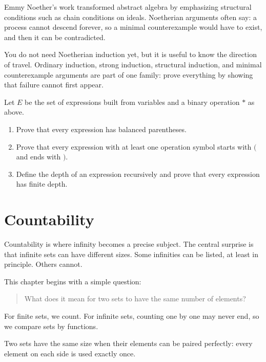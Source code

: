 \begin{historybox}
Emmy Noether's work transformed abstract algebra by emphasizing structural conditions such as chain conditions on ideals. Noetherian arguments often say: a process cannot descend forever, so a minimal counterexample would have to exist, and then it can be contradicted.
\end{historybox}

You do not need Noetherian induction yet, but it is useful to know the direction of travel. Ordinary induction, strong induction, structural induction, and minimal counterexample arguments are part of one family: prove everything by showing that failure cannot first appear.

\begin{labbox}
Let $E$ be the set of expressions built from variables and a binary operation $*$ as above.
\begin{enumerate}
\item Prove that every expression has balanced parentheses.
\item Prove that every expression with at least one operation symbol starts with $($ and ends with $)$.
\item Define the depth of an expression recursively and prove that every expression has finite depth.
\end{enumerate}
\end{labbox}

\newpage
\section{Countability}

Countability is where infinity becomes a precise subject. The central surprise is that infinite sets can have different sizes. Some infinities can be listed, at least in principle. Others cannot.

This chapter begins with a simple question:

\begin{quote}
What does it mean for two sets to have the same number of elements?
\end{quote}

For finite sets, we count. For infinite sets, counting one by one may never end, so we compare sets by functions.

\begin{focusbox}
Two sets have the same size when their elements can be paired perfectly: every element on each side is used exactly once.
\end{focusbox}

